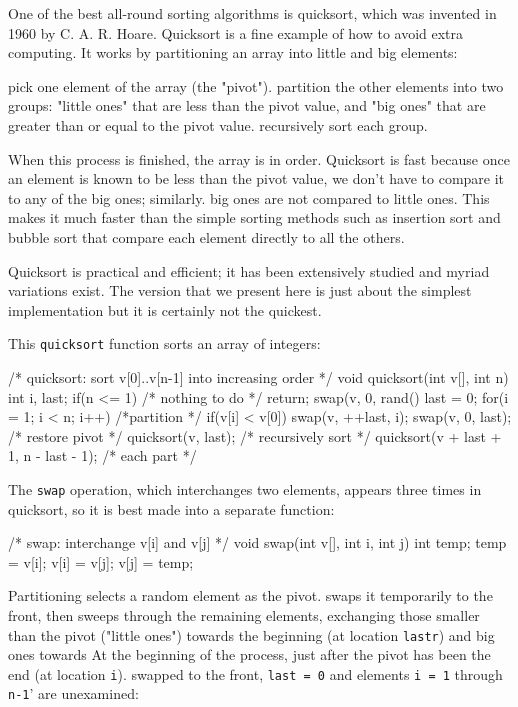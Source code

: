 One of the best all-round sorting algorithms is quicksort, which was
invented in 1960 by C. A. R. Hoare. Quicksort is a fine example of how to
avoid extra computing. It works by partitioning an array into little and
big elements:

\indent pick one element of the array (the "pivot").
\indent partition the other elements into two groups:
\indent \indent "little ones" that are less than the pivot value, and
\indent \indent "big ones" that are greater than or equal to the pivot
value.  
\indent recursively sort each group.

When this process is finished, the array is in order. Quicksort is fast
because once an element is known to be less than the pivot value, we don't
have to compare it to any of the big ones; similarly. big ones are not
compared to little ones. This makes it much faster than the simple sorting
methods such as insertion sort and bubble sort that compare each element
directly to all the others.

Quicksort is practical and efficient; it has been extensively studied and
myriad variations exist. The version that we present here is just about the
simplest implementation but it is certainly not the quickest.

This \verb'quicksort' function sorts an array of integers:
\begin{wellcode}
    /* quicksort: sort v[0]..v[n-1] into increasing order */
    void quicksort(int v[], int n)
    {
        int i, last;
        if(n <= 1) /* nothing to do */
        {
            return;
        }
        swap(v, 0, rand() %
        last = 0;
        for(i = 1; i < n; i++)  /*partition */
        {
            if(v[i] < v[0])
            {
                swap(v, ++last, i);
            }
            swap(v, 0, last);   /* restore pivot */
            quicksort(v, last); /* recursively sort */
            quicksort(v + last + 1, n - last - 1); /* each part */
        }
    }
\end{wellcode}

The \verb'swap' operation, which interchanges two elements, appears three
times in quicksort, so it is best made into a separate function:
\begin{wellcode}
    /* swap: interchange v[i] and v[j] */
    void swap(int v[], int i, int j)
    {
        int temp;
        temp = v[i];
        v[i] = v[j];
        v[j] = temp;
    }
\end{wellcode}

Partitioning selects a random element as the pivot. swaps it temporarily to
the front, then sweeps through the remaining elements, exchanging those
smaller than the pivot ("little ones") towards the beginning (at location
\verb'lastr') and big ones towards At the beginning of the process, just
after the pivot has been the end (at location \verb'i').  swapped to the
front, \verb'last = 0' and elements \verb'i = 1' through \verb'n-1'' are
unexamined:

